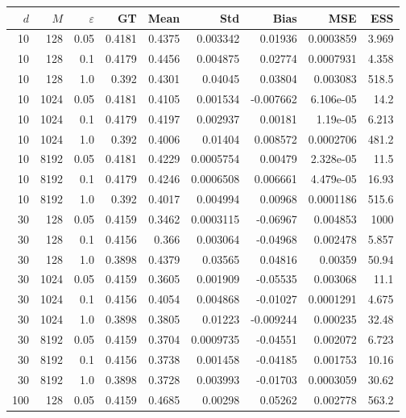 \documentclass{article}
\begin{document}
\begin{table}[htbp]
\centering
\scriptsize
\setlength{\tabcolsep}{4pt}
\begin{tabular}{rrr|rrrrrr}
\toprule
$d$ & $M$ & $\varepsilon$ & GT & Mean & Std & Bias & MSE & ESS \\
\midrule
10 & 128 & 0.05 & 0.4181 & 0.4375 & 0.003342 & 0.01936 & 0.0003859 & 3.969 \\
10 & 128 & 0.1 & 0.4179 & 0.4456 & 0.004875 & 0.02774 & 0.0007931 & 4.358 \\
10 & 128 & 1.0 & 0.392 & 0.4301 & 0.04045 & 0.03804 & 0.003083 & 518.5 \\
\midrule
10 & 1024 & 0.05 & 0.4181 & 0.4105 & 0.001534 & -0.007662 & 6.106e-05 & 14.2 \\
10 & 1024 & 0.1 & 0.4179 & 0.4197 & 0.002937 & 0.00181 & 1.19e-05 & 6.213 \\
10 & 1024 & 1.0 & 0.392 & 0.4006 & 0.01404 & 0.008572 & 0.0002706 & 481.2 \\
\midrule
10 & 8192 & 0.05 & 0.4181 & 0.4229 & 0.0005754 & 0.00479 & 2.328e-05 & 11.5 \\
10 & 8192 & 0.1 & 0.4179 & 0.4246 & 0.0006508 & 0.006661 & 4.479e-05 & 16.93 \\
10 & 8192 & 1.0 & 0.392 & 0.4017 & 0.004994 & 0.00968 & 0.0001186 & 515.6 \\
\midrule
\rowcolor{yellow!40}30 & 128 & 0.05 & 0.4159 & 0.3462 & 0.0003115 & -0.06967 & 0.004853 & 1000 \\
\rowcolor{yellow!40}30 & 128 & 0.1 & 0.4156 & 0.366 & 0.003064 & -0.04968 & 0.002478 & 5.857 \\
\rowcolor{yellow!40}30 & 128 & 1.0 & 0.3898 & 0.4379 & 0.03565 & 0.04816 & 0.00359 & 50.94 \\
\midrule
\rowcolor{yellow!40}30 & 1024 & 0.05 & 0.4159 & 0.3605 & 0.001909 & -0.05535 & 0.003068 & 11.1 \\
30 & 1024 & 0.1 & 0.4156 & 0.4054 & 0.004868 & -0.01027 & 0.0001291 & 4.675 \\
30 & 1024 & 1.0 & 0.3898 & 0.3805 & 0.01223 & -0.009244 & 0.000235 & 32.48 \\
\midrule
\rowcolor{yellow!40}30 & 8192 & 0.05 & 0.4159 & 0.3704 & 0.0009735 & -0.04551 & 0.002072 & 6.723 \\
\rowcolor{yellow!40}30 & 8192 & 0.1 & 0.4156 & 0.3738 & 0.001458 & -0.04185 & 0.001753 & 10.16 \\
30 & 8192 & 1.0 & 0.3898 & 0.3728 & 0.003993 & -0.01703 & 0.0003059 & 30.62 \\
\midrule
\rowcolor{yellow!40}100 & 128 & 0.05 & 0.4159 & 0.4685 & 0.00298 & 0.05262 & 0.002778 & 563.2 \\

\end{tabular}
\end{table}
\end{document}
